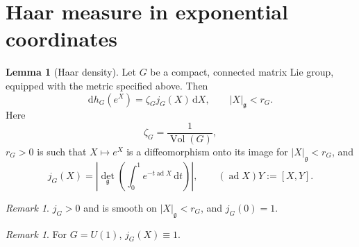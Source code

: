 \documentclass[10pt,reqno]{amsart}
\theoremstyle{definition}
\newtheorem{lemma}[definition]{Lemma}
\theoremstyle{remark}
\newtheorem{remark}[definition]{Remark}
\numberwithin{equation}{section}
\numberwithin{figure}{section}
\newcommand{\g}{\mathfrak g}
\newcommand{\dd}{\mathrm d}
\DeclareMathOperator{\ad}{ad}
\DeclareMathOperator{\Vol}{Vol}
\begin{document}
\section{Haar measure in exponential coordinates}\label{sec:haar-appendix}
\begin{lemma}[Haar density]\label{lem:haar-density}
Let $G$ be a compact, connected matrix Lie group, equipped with the metric specified above. Then
\begin{equation}\label{eq:display-102}
\boxed{
\dd h_G(e^X)=\zeta_Gj_G(X)\,\dd X,\qquad |X|_{\g}<r_G.
}
\end{equation}
Here
\begin{equation}\label{eq:display-103}
\zeta_G=\frac1{\Vol(G)},
\end{equation}
$r_G>0$ is such that $X\mapsto e^X$ is a diffeomorphism onto its image for $|X|_\g<r_G$, and
\begin{equation}\label{eq:display-104}
j_G(X)=\left|\det_{\g}\left(\int_0^1e^{-t\ad X}\,\dd t\right)\right|,
\qquad (\ad X)Y:=[X,Y].
\end{equation}
\end{lemma}

\begin{remark} $j_G>0$ and is smooth on $|X|_\g<r_G$, and $j_G(0)=1$.\end{remark}

\begin{remark} For $G=U(1)$, $j_G(X)\equiv1$.\end{remark}
\end{document}
